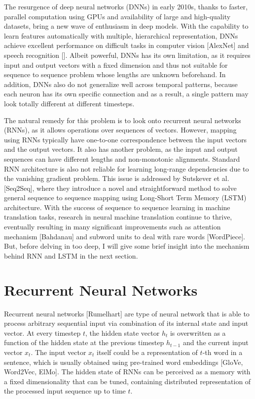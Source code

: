 \documentclass[12pt]{extarticle}
\begin{document}
The resurgence of deep neural networks (DNNs) in early 2010s, thanks to faster, parallel computation using GPUs and availability of large and high-quality datasets, bring a new wave of enthusiasm in deep models. With the capability to learn features automatically with multiple, hierarchical representation, DNNs achieve excellent performance on difficult tasks in computer vision [AlexNet] and speech recognition []. Albeit powerful, DNNs has its own limitation, as it requires input and output vectors with a fixed dimension and thus not suitable for sequence to sequence problem whose lengths are unknown beforehand. In addition, DNNs also do not generalize well across temporal patterns, because each neuron has its own specific connection and as a result, a single pattern may look totally different at different timesteps.

The natural remedy for this problem is to look onto recurrent neural networks (RNNs), as it allows operations over sequences of vectors. However, mapping using RNNs typically have one-to-one correspondence between the input vectors and the output vectors. It also has another problem, as the input and output sequences can have different lengths and non-monotonic alignments. Standard RNN architecture is also not reliable for learning long-range dependencies due to the vanishing gradient problem. This issue is addressed by Sutskever et al. [Seq2Seq], where they introduce a novel and straightforward method to solve general sequence to sequence mapping using Long-Short Term Memory (LSTM) architecture. With the success of sequence to sequence learning in machine translation tasks, research in neural machine translation continue to thrive, eventually resulting in many significant improvements such as attention mechanism [Bahdanau] and subword units to deal with rare words [WordPiece]. But, before delving in too deep, I will give some brief insight into the mechanism behind RNN and LSTM in the next section. 



 

\section*{Recurrent Neural Networks} %

Recurrent neural networks [Rumelhart] are type of neural network that is able to process arbitrary sequential input via combination of its internal state and input vector. At every timestep $t$, the hidden state vector $h_{t}$ is overwritten as a function of the hidden state at the previous timestep $h_{t-1}$ and the current input vector $x_{t}$. The input vector $x_{t}$ itself could be a representation of $t$-th word in a sentence, which is usually obtained using pre-trained word embeddings [GloVe, Word2Vec, ElMo]. The hidden state of RNNs can be perceived as a memory with a fixed dimensionality that can be tuned, containing distributed representation of the processed input sequence up to time $t$.
\end{document}
